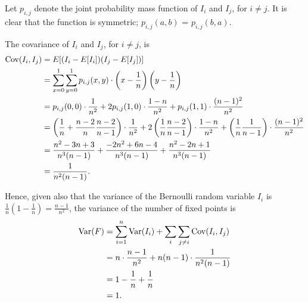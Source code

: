 \documentclass{article}
\DeclareMathOperator{\Cov}{Cov}
\DeclareMathOperator{\Var}{Var}
\begin{document}
\begin{enumerate}
    Let $p_{i,j}$ denote the joint probability mass function of $I_i$ and $I_j$, for $i\neq j$.
    It is clear that the function is symmetric; $p_{i,j}(a,b)$ = $p_{i,j}(b,a)$.

    The covariance of $I_i$ and $I_j$, for $i\neq j$, is
    \[\begin{split}
    \Cov(I_i, I_j)  & = E[(I_i-E[I_i])(I_j-E[I_j])] \\
                    & = \sum_{x=0}^1\sum_{y=0}^1 p_{i,j}(x,y)\cdot \left(x-\frac{1}{n}\right)\left(y-\frac{1}{n}\right) \\
                    & = p_{i,j}(0,0) \cdot \frac{1}{n^2} + 2p_{i,j}(1,0) \cdot \frac{1-n}{n^2} + p_{i,j}(1,1) \cdot \frac{(n-1)^2}{n^2} \\
                    & = \left(\frac{1}{n} + \frac{n-2}{n}\frac{n-2}{n-1}\right)\cdot\frac{1}{n^2}
                        + 2\left(\frac{1}{n}\frac{n-2}{n-1}\right)\cdot\frac{1-n}{n^2}
                        + \left(\frac{1}{n}\frac{1}{n-1}\right)\cdot\frac{(n-1)^2}{n^2} \\
                    & = \frac{n^2-3n+3}{n^3(n-1)} + \frac{-2n^2+6n-4}{n^3(n-1)} + \frac{n^2-2n+1}{n^3(n-1)} \\
                    & = \frac{1}{n^2(n-1)} \text.
    \end{split}\]

    Hence, given also that the variance of the Bernoulli random variable $I_i$ is $\frac{1}{n}\left(1-\frac{1}{n}\right)=\frac{n-1}{n^2}$, the variance of the number of fixed points is
    \[\begin{split}
    \Var(F) & = \sum_{i=1}^n\Var(I_i) + \sum_i\sum_{j\neq i}\Cov(I_i,I_j) \\
            & = n\cdot\frac{n-1}{n^2} + n(n-1)\cdot \frac{1}{n^2(n-1)} \\
            & = 1 - \frac{1}{n} + \frac{1}{n} \\
            & = 1 \text.
    \end{split}\]


\end{enumerate}
\end{document}
